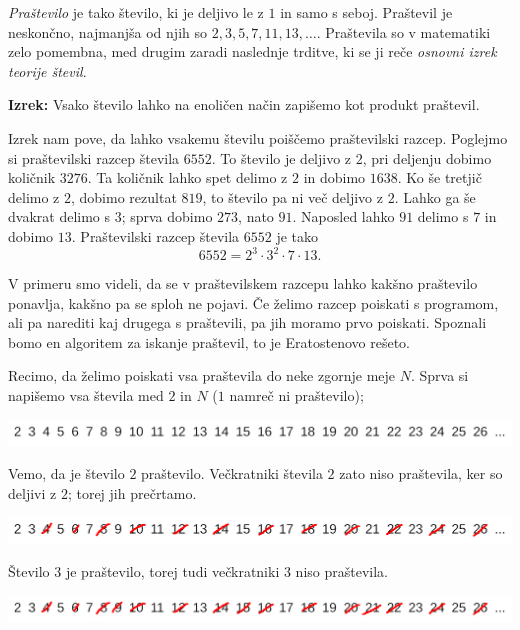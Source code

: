 \emph{Praštevilo} je tako število, ki je deljivo le z $1$ in samo s seboj.
Praštevil je neskončno, najmanjša od njih so $2, 3, 5, 7, 11, 13, \ldots$.
Praštevila so v matematiki zelo pomembna, med drugim zaradi naslednje trditve,
ki se ji reče \emph{osnovni izrek teorije števil}.

\vspace{0.5cm}

\textbf{Izrek:} Vsako število lahko na enoličen način zapišemo kot produkt
praštevil.

\begin{examples}
  Izrek nam pove, da lahko vsakemu številu poiščemo praštevilski razcep.
  Poglejmo si praštevilski razcep števila $6552$.
  To število je deljivo z $2$, pri deljenju dobimo količnik $3276$.
  Ta količnik lahko spet delimo z $2$ in dobimo $1638$.
  Ko še tretjič delimo z $2$, dobimo rezultat $819$, to število pa ni več
  deljivo z $2$.
  Lahko ga še dvakrat delimo s $3$; sprva dobimo $273$, nato $91$.
  Naposled lahko $91$ delimo s $7$ in dobimo $13$.
  Praštevilski razcep števila $6552$ je tako
  \[
	6552 = 2^3 \cdot 3^2 \cdot 7 \cdot 13.
  \]
\end{examples}

V primeru smo videli, da se v praštevilskem razcepu lahko kakšno praštevilo
ponavlja, kakšno pa se sploh ne pojavi.
Če želimo razcep poiskati s programom, ali pa narediti kaj drugega s praštevili,
pa jih moramo prvo poiskati.
Spoznali bomo en algoritem za iskanje praštevil, to je Eratostenovo rešeto.

Recimo, da želimo poiskati vsa praštevila do neke zgornje meje $N$.
Sprva si napišemo vsa števila med $2$ in $N$ ($1$ namreč ni praštevilo);

\includegraphics[width=\linewidth]{chapters/teorija-stevil/slike/reseto1}

Vemo, da je število $2$ praštevilo.
Večkratniki števila $2$ zato niso praštevila, ker so deljivi z $2$; torej jih
prečrtamo.

\includegraphics[width=\linewidth]{chapters/teorija-stevil/slike/reseto2}

Število $3$ je praštevilo, torej tudi večkratniki $3$ niso praštevila.

\includegraphics[width=\linewidth]{chapters/teorija-stevil/slike/reseto3}

